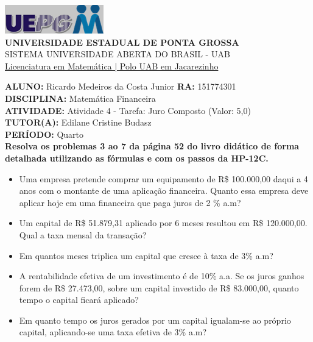 \documentclass[a4paper, 12pt]{article}
\begin{document}
\begin{flushleft}\includegraphics{logo}\\
\textbf{UNIVERSIDADE ESTADUAL DE PONTA GROSSA} \\
SISTEMA UNIVERSIDADE ABERTA DO BRASIL - UAB \\
\underline{Licenciatura em Matemática | Polo UAB em Jacarezinho}\end{flushleft} 
\textbf{ALUNO:} Ricardo Medeiros da Costa Junior   \textbf{RA:} 151774301 \\
\textbf{DISCIPLINA:} Matemática Financeira \\
\textbf{ATIVIDADE:} Atividade 4 - Tarefa: Juro Composto (Valor: 5,0) \\ 
\textbf{TUTOR(A):} Edilane Cristine Budasz \\
\textbf{PERÍODO:} Quarto \\

\textbf{Resolva os problemas 3 ao 7 da página 52 do livro didático de forma detalhada utilizando as fórmulas e com os passos da HP-12C.}

\begin{itemize}

\item Uma empresa pretende comprar um equipamento de R\$ 100.000,00 daqui
a 4 anos com o montante de uma aplicação financeira. Quanto essa empresa
deve aplicar hoje em uma financeira que paga juros de 2 \% a.m?

\item Um  capital  de  R\$  51.879,31  aplicado  por  6  meses  resultou  em  R\$ 120.000,00. Qual a taxa mensal da transação?

\item Em quantos meses triplica um capital que cresce à taxa de 3\% a.m?

\item  A rentabilidade efetiva de um investimento é de 10\% a.a. Se os juros 
ganhos forem de R\$ 27.473,00, sobre um capital investido de R\$ 83.000,00, 
quanto tempo o capital ficará aplicado?

\item Em quanto tempo os juros gerados por um capital igualam-se ao próprio 
capital, aplicando-se uma taxa efetiva de 3\% a.m?
  
\end{itemize}
\end{document}
